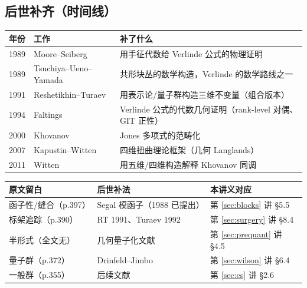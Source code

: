 \subsection{后世补齐（时间线）}
\begin{center}
\begin{tabular}{@{}llp{8.4cm}@{}}
\toprule
年份 & 工作 & 补了什么 \\
\midrule
1989 & Moore--Seiberg & 用手征代数给 Verlinde 公式的物理证明 \\
1989 & Tsuchiya--Ueno--Yamada & 共形块丛的数学构造，Verlinde 的数学路线之一 \\
1991 & Reshetikhin--Turaev & 用表示论/量子群构造三维不变量（组合版本） \\
1994 & Faltings & Verlinde 公式的代数几何证明（rank-level 对偶、GIT 正性） \\
2000 & Khovanov & Jones 多项式的范畴化 \\
2007 & Kapustin--Witten & 四维扭曲理论框架（几何 Langlands） \\
2011 & Witten & 用五维/四维构造解释 Khovanov 同调 \\
\bottomrule
\end{tabular}
\end{center}

\begin{center}
\begin{tabular}{@{}p{4.2cm}p{3.4cm}p{6.0cm}@{}}
\toprule
原文留白 & 后世补法 & 本讲义对应 \\
\midrule
函子性/缝合（p.397） & Segal 模函子（1988 已提出） & 第 \ref{sec:blocks} 讲 \S5.5 \\
标架追踪（p.390） & RT 1991、Turaev 1992 & 第 \ref{sec:surgery} 讲 \S8.4 \\
半形式（全文无） & 几何量子化文献 & 第 \ref{sec:prequant} 讲 \S4.5 \\
量子群（p.372） & Drinfeld--Jimbo & 第 \ref{sec:wilson} 讲 \S6.4 \\
一般群（p.355） & 后续文献 & 第 \ref{sec:cs} 讲 \S2.6 \\
\bottomrule
\end{tabular}
\end{center}

